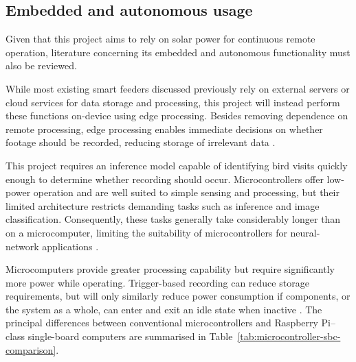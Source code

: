 \subsection{Embedded and autonomous usage}


Given that this project aims to rely on solar power for continuous remote operation, literature concerning its embedded and autonomous functionality must also be reviewed.
\par\vspace{6pt}
While most existing smart feeders discussed previously rely on external servers or cloud services for data storage and processing, this project will instead perform these functions on-device using edge processing. Besides removing dependence on remote processing, edge processing enables immediate decisions on whether footage should be recorded, reducing storage of irrelevant data \cite{DarrasEtAl2024}.
\par\vspace{6pt}
This project requires an inference model capable of identifying bird visits quickly enough to determine whether recording should occur. Microcontrollers offer low-power operation and are well suited to simple sensing and processing, but their limited architecture restricts demanding tasks such as inference and image classification. Consequently, these tasks generally take considerably longer than on a microcomputer, limiting the suitability of microcontrollers for neural-network applications \cite{BallerEtAl2021}.
\par\vspace{6pt}
Microcomputers provide greater processing capability but require significantly more power while operating. Trigger-based recording can reduce storage requirements, but will only similarly reduce power consumption if components, or the system as a whole, can enter and exit an idle state when inactive \cite{BalleEtAl2025}. The principal differences between conventional microcontrollers and Raspberry Pi--class single-board computers are summarised in Table~\ref{tab:microcontroller-sbc-comparison}.

